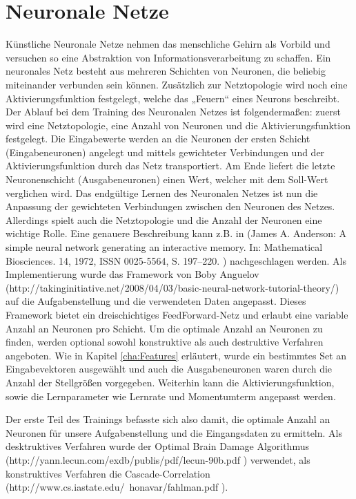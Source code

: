 \section{Neuronale Netze} %
\label{sec:NN}
Künstliche Neuronale Netze nehmen das menschliche Gehirn als Vorbild und versuchen so eine Abstraktion von Informationsverarbeitung zu schaffen. Ein neuronales Netz besteht aus mehreren Schichten von Neuronen, die beliebig miteinander verbunden sein können. Zusätzlich zur Netztopologie wird noch eine Aktivierungsfunktion festgelegt, welche das „Feuern“ eines Neurons beschreibt. Der Ablauf bei dem Training des Neuronalen Netzes ist folgendermaßen: zuerst wird eine Netztopologie, eine Anzahl von Neuronen und die Aktivierungsfunktion festgelegt. Die Eingabewerte werden an die Neuronen der ersten Schicht (Eingabeneuronen) angelegt und mittels gewichteter Verbindungen und der Aktivierungsfunktion durch das Netz transportiert. Am Ende liefert die letzte Neuronenschicht (Ausgabeneuronen) einen Wert, welcher mit dem Soll-Wert verglichen wird. Das endgültige Lernen des Neuronalen Netzes ist nun die Anpassung der gewichteten Verbindungen zwischen den Neuronen des Netzes. Allerdings spielt auch die Netztopologie und die Anzahl der Neuronen eine wichtige Rolle. Eine genauere Beschreibung kann z.B. in (James A. Anderson: A simple neural network generating an interactive memory. In: Mathematical Biosciences. 14, 1972, ISSN 0025-5564, S. 197–220. ) nachgeschlagen werden.
Als Implementierung wurde das Framework von Boby Anguelov (http://takinginitiative.net/2008/04/03/basic-neural-network-tutorial-theory/) auf die Aufgabenstellung und die verwendeten Daten angepasst. Dieses Framework bietet ein dreischichtiges FeedForward-Netz und erlaubt eine variable Anzahl an Neuronen pro Schicht. Um die optimale Anzahl an Neuronen zu finden, werden optional sowohl konstruktive als auch destruktive Verfahren angeboten. Wie in Kapitel \ref{cha:Features} erläutert, wurde ein bestimmtes Set an Eingabevektoren ausgewählt und auch die Ausgabeneuronen waren durch die Anzahl der Stellgrößen vorgegeben. Weiterhin kann die Aktivierungsfunktion, sowie die Lernparameter wie Lernrate und Momentumterm angepasst werden. 

Der erste Teil des Trainings befasste sich also damit, die optimale Anzahl an Neuronen für unsere Aufgabenstellung und die Eingangsdaten zu ermitteln. Als desktruktives Verfahren wurde der Optimal Brain Damage Algorithmus (http://yann.lecun.com/exdb/publis/pdf/lecun-90b.pdf ) verwendet, als konstruktives Verfahren die Cascade-Correlation (http://www.cs.iastate.edu/~honavar/fahlman.pdf ). \\

